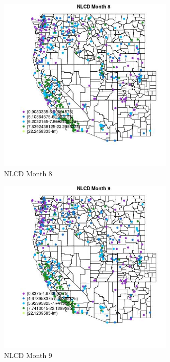 \begin{figure} 
\centering  
\includegraphics[width=0.77\textwidth]{Code_Outputs/ML_input_report_ML_input_PM25_Step5_part_d_de_duplicated_aves_ML_input_MapObsMo8NLCD.jpg} 
\caption{\label{fig:ML_input_report_ML_input_PM25_Step5_part_d_de_duplicated_aves_ML_inputMapObsMo8NLCD}NLCD Month 8} 
\end{figure} 
 

\begin{figure} 
\centering  
\includegraphics[width=0.77\textwidth]{Code_Outputs/ML_input_report_ML_input_PM25_Step5_part_d_de_duplicated_aves_ML_input_MapObsMo9NLCD.jpg} 
\caption{\label{fig:ML_input_report_ML_input_PM25_Step5_part_d_de_duplicated_aves_ML_inputMapObsMo9NLCD}NLCD Month 9} 
\end{figure} 
 

